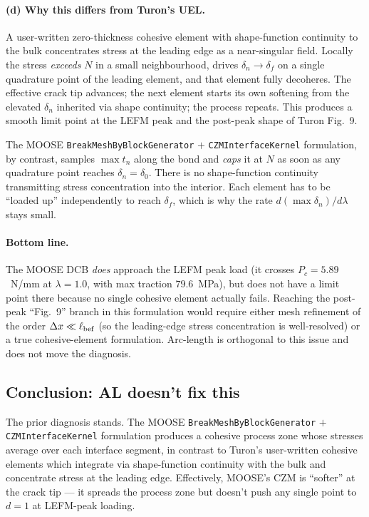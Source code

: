 \paragraph{(d) Why this differs from Turon's UEL.}
A user-written zero-thickness cohesive element with shape-function
continuity to the bulk concentrates stress at the leading edge as a
near-singular field. Locally the stress \emph{exceeds} $N$ in a
small neighbourhood, drives $\delta_n \to \delta_f$ on a single
quadrature point of the leading element, and that element fully
decoheres. The effective crack tip advances; the next element starts
its own softening from the elevated $\delta_n$ inherited via shape
continuity; the process repeats. This produces a smooth limit point
at the LEFM peak and the post-peak shape of Turon Fig.~9.

The MOOSE \texttt{BreakMeshByBlockGenerator} $+$
\texttt{CZMInterfaceKernel} formulation, by contrast, samples
$\max t_n$ along the bond and \emph{caps} it at $N$ as soon as any
quadrature point reaches $\delta_n = \delta_0$. There is no
shape-function continuity transmitting stress concentration into the
interior. Each element has to be ``loaded up'' independently to reach
$\delta_f$, which is why the rate $d(\max\delta_n)/d\lambda$ stays
small.

\paragraph{Bottom line.} The MOOSE DCB \emph{does} approach the LEFM
peak load (it crosses $P_c = 5.89$~N/mm at $\lambda = 1.0$, with
max traction $79.6$~MPa), but does not have a limit point there
because no single cohesive element actually fails. Reaching the
post-peak ``Fig.~9'' branch in this formulation would require either
mesh refinement of the order $\Delta x \ll \ell_{\rm bef}$ (so the
leading-edge stress concentration is well-resolved) or a true
cohesive-element formulation. Arc-length is orthogonal to this issue
and does not move the diagnosis.

\subsection{Conclusion: AL doesn't fix this}

The prior diagnosis stands. The MOOSE \texttt{BreakMeshByBlockGenerator}
$+$ \texttt{CZMInterfaceKernel} formulation produces a cohesive process
zone whose stresses average over each interface segment, in contrast to
Turon's user-written cohesive elements which integrate via shape-function
continuity with the bulk and concentrate stress at the leading edge.
Effectively, MOOSE's CZM is ``softer'' at the crack tip — it spreads the
process zone but doesn't push any single point to $d = 1$ at LEFM-peak
loading.

